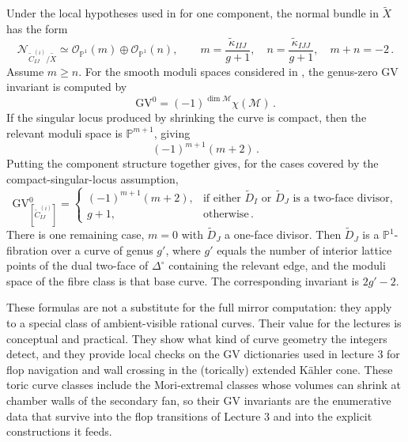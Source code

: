 Under the local hypotheses used in
\cite{Braun:2017nhi,Demirtas:2023als} for one component, the normal bundle in
$\widetilde X$ has the form
\begin{equation}
    \mathcal N_{\widetilde C_{IJ}^{(i)}/\widetilde X}
      \simeq
      \mathcal{O}_{\mathbb{P}^1}(m)\oplus
      \mathcal{O}_{\mathbb{P}^1}(n),
    \qquad
    m=\frac{\widetilde\kappa_{IIJ}}{g+1},\quad
    n=\frac{\widetilde\kappa_{IJJ}}{g+1},\quad
    m+n=-2\, .
\end{equation}
Assume $m\geq n$.  For the smooth moduli spaces considered in
\cite{Demirtas:2023als}, the genus-zero GV invariant is computed by
\begin{equation}
    \mathrm{GV}^0=(-1)^{\dim\mathcal{M}}\chi(\mathcal{M})\, .
\end{equation}
If the singular locus produced by shrinking the curve is compact,
then the relevant moduli space is $\mathbb{P}^{m+1}$, giving
\begin{equation}
    (-1)^{m+1}(m+2)\, .
\end{equation}
Putting the component structure together gives, for the cases covered
by the compact-singular-locus assumption,
\begin{equation}
    \mathrm{GV}^{0}_{[\widetilde C_{IJ}^{(i)}]}
      =
      \begin{cases}
      (-1)^{m+1}(m+2),
        & \text{if either }\widetilde D_I\text{ or }\widetilde D_J\text{ is a two-face divisor},\\
      g+1,
        & \text{otherwise}\, .
      \end{cases}
\end{equation}
There is one remaining case, $m=0$ with $\widetilde D_J$
a one-face divisor. Then $\widetilde D_J$ is a
$\mathbb{P}^1$-fibration over a curve of genus $g'$, where
$g'$ equals the number of interior lattice points of the dual
two-face of $\Delta^\circ$ containing the relevant edge, and the
moduli space of the fibre class is that base curve. The
corresponding invariant is $2g'-2$.

These formulas are not a substitute for the full mirror computation:
they apply to a special class of ambient-visible rational curves.
Their value for the lectures is conceptual and practical.  They show
what kind of curve geometry the integers detect, and they provide
local checks on the GV dictionaries used in lecture 3 for flop navigation and wall crossing in the (torically) extended Kähler cone.
These toric curve classes include the
Mori-extremal classes whose volumes can shrink at chamber walls of
the secondary fan, so their GV invariants are the enumerative data
that survive into the flop transitions of Lecture 3 and into the
explicit constructions it feeds.


